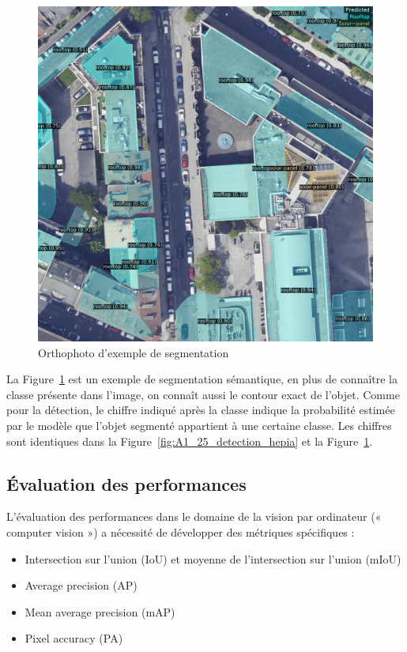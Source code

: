 \begin{figure}[H]
    \centering
    \includegraphics[width=1\linewidth]{03-tail//A1_fondamentaux_ML//A1_figures/A1_30_segmentation_semantique_hepia.png}
    \caption{Orthophoto d'exemple de segmentation}
    \label{fig:A1_30_segmentation_semantique_hepia}
\end{figure}

La Figure~\ref{fig:A1_30_segmentation_semantique_hepia} est un exemple de segmentation sémantique, en plus de connaître la classe présente dans l'image, on connaît aussi le contour exact de l'objet. Comme pour la détection, le chiffre indiqué après la classe indique la probabilité estimée par le modèle que l'objet segmenté appartient à une certaine classe. Les chiffres sont identiques dans la Figure~\ref{fig:A1_25_detection_hepia} et la Figure~\ref{fig:A1_30_segmentation_semantique_hepia}.

\subsection{Évaluation des performances}
\label{subsec:evaluation_des_performances}

L'évaluation des performances dans le domaine de la vision par ordinateur (« computer vision ») a nécessité de développer des métriques spécifiques :
\begin{itemize}
    \item Intersection sur l'union (IoU) et moyenne de l'intersection sur l'union (mIoU)
    \item Average precision (AP)
    \item Mean average precision (mAP)
    \item Pixel accuracy (PA)
\end{itemize}

